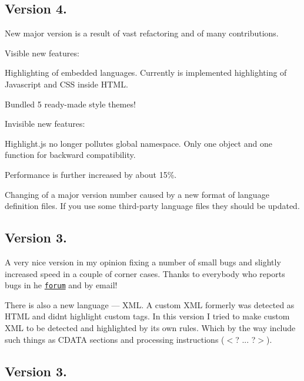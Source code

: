 \subsection*{Version 4.}

New major version is a result of vast refactoring and of many contributions.

Visible new features\+:


\begin{DoxyItemize}
\item Highlighting of embedded languages. Currently is implemented highlighting of Javascript and C\+SS inside H\+T\+ML.
\item Bundled 5 ready-\/made style themes!
\end{DoxyItemize}

Invisible new features\+:


\begin{DoxyItemize}
\item Highlight.\+js no longer pollutes global namespace. Only one object and one function for backward compatibility.
\item Performance is further increased by about 15\%.
\end{DoxyItemize}

Changing of a major version number caused by a new format of language definition files. If you use some third-\/party language files they should be updated.

\subsection*{Version 3.}

A very nice version in my opinion fixing a number of small bugs and slightly increased speed in a couple of corner cases. Thanks to everybody who reports bugs in he \href{http://softwaremaniacs.org/forum/viewforum.php?id=6}{\tt forum} and by email!

There is also a new language — X\+ML. A custom X\+ML formerly was detected as H\+T\+ML and didn\textquotesingle{}t highlight custom tags. In this version I tried to make custom X\+ML to be detected and highlighted by its own rules. Which by the way include such things as C\+D\+A\+TA sections and processing instructions ({\ttfamily $<$? ... ?$>$}).

\subsection*{Version 3.}

